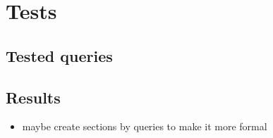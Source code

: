 \chapter{Tests}

\section{Tested queries}
\section{Results}

\begin{itemize}
\item maybe create sections by queries to make it more formal
\end{itemize}

